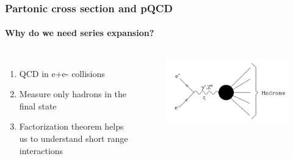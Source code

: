 \documentclass[aspectratio=43]{beamer}
\begin{document}
\begin{frame}

	\frametitle{Partonic cross section and pQCD}
	\framesubtitle{Why do we need series expansion?}
	\begin{columns}
		
		
		\begin{enumerate}
			\item QCD in e+e- collisions
			\item Measure only hadrons in the final state
			\item Factorization theorem helps us to understand short range interactions
		\end{enumerate}
		
		\begin{figure}[!htb]
			\includegraphics[width = \linewidth]{plots/ee_hadrons.png}
		\end{figure}
	
	\end{columns}

\end{frame}
\end{document}
